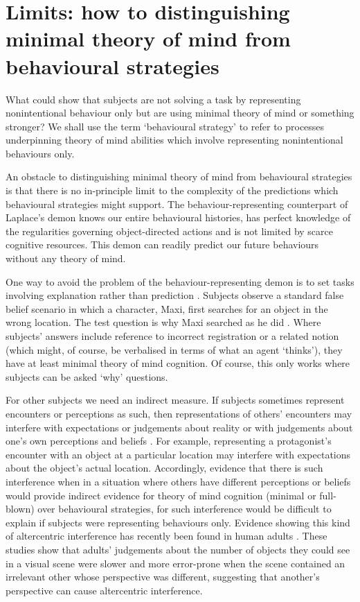 \documentclass[12pt,\papersize]{extarticle}
\begin{document}
\section{Limits: how to distinguishing minimal theory of mind from behavioural strategies}
\label{sec:limits2}
What could show that subjects are not solving a task by representing nonintentional behaviour only but are using minimal theory of mind or something stronger?  
We shall use the term ‘behavioural strategy’ to refer to processes underpinning theory of mind abilities which involve representing nonintentional behaviours only. 

An obstacle to distinguishing minimal theory of mind from behavioural strategies is that there is no in-principle limit to the complexity of the predictions which behavioural strategies might support.  The behaviour-representing counterpart of Laplace’s demon knows our entire behavioural histories, has perfect knowledge of the regularities governing object-directed actions and is not limited by scarce cognitive resources.  This demon can readily predict our future behaviours without any theory of mind.  

One way to avoid the problem of the behaviour-representing demon is to set tasks involving explanation rather than prediction \citep[compare][p.\ Chapter 8]{en_167}.  Subjects observe a standard false belief scenario in which a character, Maxi, first searches for an object in the wrong location.  The test question is why Maxi searched as he did \citep[see e.g.][]{en_80, en_352}.  Where subjects’ answers include reference to incorrect registration or a related notion (which might, of course, be verbalised in terms of what an agent ‘thinks’), they have at least minimal theory of mind cognition.  Of course, this only works where subjects can be asked ‘why’ questions.

For other subjects we need an indirect measure.  If subjects sometimes represent encounters or perceptions as such, then representations of others’ encounters may interfere with expectations or judgements about reality or with judgements about one’s own perceptions and beliefs \citep[so-called `altercentric interference',][]{Samson:2010jm}.  For example, representing a protagonist's encounter with an object at a particular location may interfere with expectations about the object’s actual location.  Accordingly, evidence that there is such interference when in a situation where others have different perceptions or beliefs would provide indirect evidence for theory of mind cognition (minimal or full-blown) over behavioural strategies, for such interference would be difficult to explain if subjects were representing behaviours only. Evidence showing this kind of altercentric interference has recently been found in human adults \citep[]{en_1797, Samson:2010jm}. These studies show that adults’ judgements about the number of objects they could see in a visual scene were slower and more error-prone when the scene contained an irrelevant other whose perspective was different, suggesting that another’s perspective can cause altercentric interference. 
\end{document}
